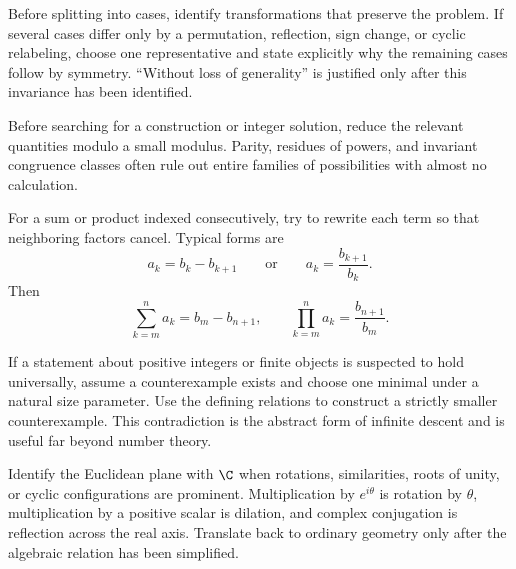     \begin{strategy}
        Before splitting into cases, identify transformations that preserve the
        problem. If several cases differ only by a permutation, reflection,
        sign change, or cyclic relabeling, choose one representative and state
        explicitly why the remaining cases follow by symmetry. ``Without loss
        of generality'' is justified only after this invariance has been
        identified.
    \end{strategy}

    \begin{strategy}
        Before searching for a construction or integer solution, reduce the
        relevant quantities modulo a small modulus. Parity, residues of powers,
        and invariant congruence classes often rule out entire families of
        possibilities with almost no calculation.
    \end{strategy}

    \begin{strategy}
        For a sum or product indexed consecutively, try to rewrite each term so
        that neighboring factors cancel. Typical forms are
        \[
            a_k=b_k-b_{k+1}
            \qquad\text{or}\qquad
            a_k=\frac{b_{k+1}}{b_k}.
        \]
        Then
        \[
            \sum_{k=m}^{n}a_k=b_m-b_{n+1},
            \qquad
            \prod_{k=m}^{n}a_k=\frac{b_{n+1}}{b_m}.
        \]
    \end{strategy}

    \begin{strategy}
        If a statement about positive integers or finite objects is suspected to
        hold universally, assume a counterexample exists and choose one minimal
        under a natural size parameter. Use the defining relations to construct
        a strictly smaller counterexample. This contradiction is the abstract
        form of infinite descent and is useful far beyond number theory.
    \end{strategy}

    \begin{strategy}
        Identify the Euclidean plane with $\C$ when rotations, similarities,
        roots of unity, or cyclic configurations are prominent. Multiplication
        by $e^{i\theta}$ is rotation by $\theta$, multiplication by a positive
        scalar is dilation, and complex conjugation is reflection across the
        real axis. Translate back to ordinary geometry only after the algebraic
        relation has been simplified.
    \end{strategy}

